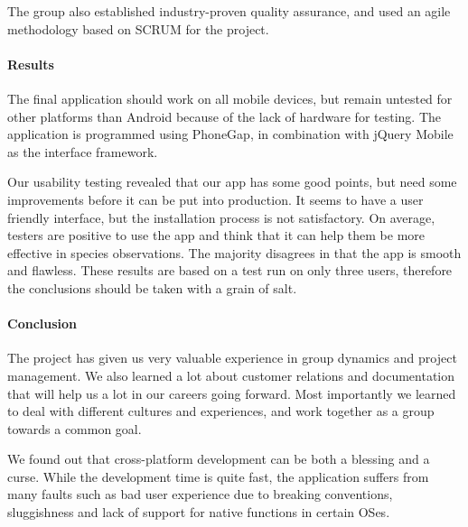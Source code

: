The group also established industry-proven quality assurance, and used an agile
methodology based on SCRUM for the project. 

\paragraph{Results}
The final application should work on all mobile devices, but remain untested for
other platforms than Android because of the lack of hardware for testing. The
application is programmed using PhoneGap, in combination with jQuery Mobile as the
interface framework.

Our usability testing revealed that our app has some good points, but need some
improvements before it can be put into production. It seems to have a user
friendly interface, but the installation process is not satisfactory. On
average, testers are positive to use the app and think that it can help them be
more effective in species observations. The majority disagrees in that the app
is smooth and flawless. These results are based on a test run on only three users,
therefore the conclusions should be taken with a grain of salt.

\paragraph{Conclusion}
The project has given us very valuable experience in group dynamics and project
management. We also learned a lot about customer relations and documentation
that will help us a lot in our careers going forward. Most importantly we
learned to deal with different cultures and experiences, and work together as a
group towards a common goal.

We found out that cross-platform development can be both a blessing and a curse.
While the development time is quite fast, the application suffers from many
faults such as bad user experience due to breaking conventions, sluggishness and
lack of support for native functions in certain OSes. 
